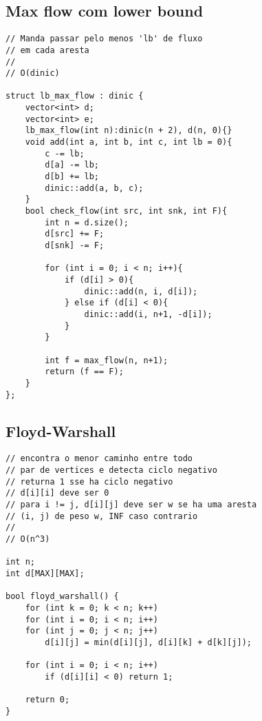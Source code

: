 \documentclass[12pt, a4paper, twoside]{article}
\begin{document}
\subsection{Max flow com lower bound}
\begin{lstlisting}
// Manda passar pelo menos 'lb' de fluxo
// em cada aresta
//
// O(dinic)

struct lb_max_flow : dinic {
	vector<int> d;
	vector<int> e;
	lb_max_flow(int n):dinic(n + 2), d(n, 0){}
	void add(int a, int b, int c, int lb = 0){
		c -= lb;
		d[a] -= lb;
		d[b] += lb;
		dinic::add(a, b, c);
	}
	bool check_flow(int src, int snk, int F){
		int n = d.size();
		d[src] += F;
		d[snk] -= F;

		for (int i = 0; i < n; i++){
			if (d[i] > 0){
				dinic::add(n, i, d[i]);
			} else if (d[i] < 0){
				dinic::add(i, n+1, -d[i]);
			}
		}

		int f = max_flow(n, n+1);
		return (f == F);
	}
};
\end{lstlisting}

\subsection{Floyd-Warshall}
\begin{lstlisting}
// encontra o menor caminho entre todo
// par de vertices e detecta ciclo negativo
// returna 1 sse ha ciclo negativo
// d[i][i] deve ser 0
// para i != j, d[i][j] deve ser w se ha uma aresta
// (i, j) de peso w, INF caso contrario
//
// O(n^3)

int n;
int d[MAX][MAX];

bool floyd_warshall() {
	for (int k = 0; k < n; k++)
	for (int i = 0; i < n; i++)
	for (int j = 0; j < n; j++)
		d[i][j] = min(d[i][j], d[i][k] + d[k][j]);

	for (int i = 0; i < n; i++)
		if (d[i][i] < 0) return 1;

	return 0;
}
\end{lstlisting}
\end{document}
